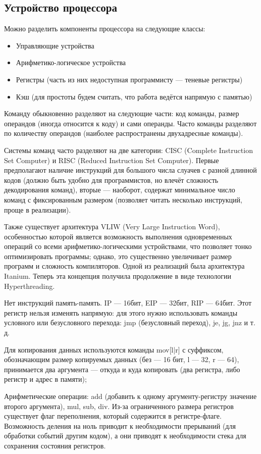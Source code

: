 \documentclass[main]{subfiles}
\begin{document}
\subsection{Устройство процессора}
Можно разделить компоненты процессора на следующие классы:
\begin{itemize}
\item Управляющие устройства
\item Арифметико-логическое устройства
\item Регистры (часть из них недоступная программисту ---
теневые регистры)
\item Кэш (для простоты будем считать, что работа ведётся напрямую с памятью)
\end{itemize}

Команду обыкновенно разделяют на следующие части:
код команды, размер операндов (иногда относится к коду) и сами операнды.
Часто команды разделяют по количеству операндов (наиболее распространены
двухадресные команды).

Системы команд часто разделяют на две категории:
CISC (Complete Instruction Set Computer) и RISC (Reduced Instruction Set Computer).
Первые предполагают наличие инструкций для большого числа слуачев
с разной длинной кодов
(должно быть удобно для программистов, но влечёт сложность декодирования
команд), вторые --- наоборот, содержат минимальное число команд с
фиксированным размером (позволяет читать несколько инструкций,
проще в реализации).

Также существует архитектура VLIW (Very Large Instruction Word),
особенностью которой является возможность выполнения одновременных
операций со всеми арифметико-логическими устройствами,
что позволяет тонко оптимизировать программы; однако, это
существенно увеличивает размер программ и сложность компиляторов.
Одной из реализаций была архитектура Itanium.
Теперь эта концепция получила продолжение в виде технологии
Hyperthreading.

Нет инструкций память-память.
IP --- 16бит, EIP --- 32бит, RIP --- 64бит.
Этот регистр нельзя изменять напрямую: для этого нужно использовать
команды условного или безусловного перехода:
jmp (безусловный переход), je, jg, jnz и т. д.

Для копирования данных используются команды mov[l|r] с суффиксом, обозначающим
размер копируемых данных (без --- 16 бит, l --- 32, r --- 64), принимается
два аргумента --- откуда и куда копировать (два регистра, либо регистр и адрес в памяти);

Арифметические операции: add (добавить к одному аргументу-регистру значение второго
аргумента), mul, sub, div. Из-за ограниченного размера регистров существует флаг
переполнения, который содержится в регистре-флаге. Возможность деления на ноль
приводит к необходимости прерываний (для обработки событий другим кодом),
а они приводят к необходимости стека для сохранения состояния регистров.
\end{document}
